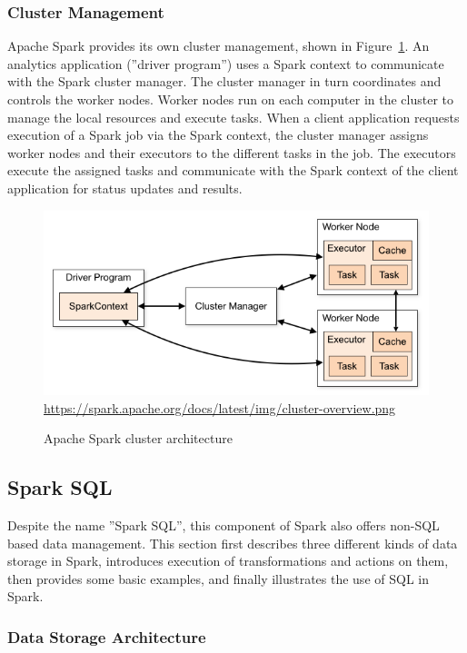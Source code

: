 \subsubsection*{Cluster Management}

Apache Spark provides its own cluster management, shown in Figure~\ref{fig:sparkcluster}. An analytics application (''driver program'') uses a Spark context to communicate with the Spark cluster manager. The cluster manager in turn coordinates and controls the worker nodes. Worker nodes run on each computer in the cluster to manage the local resources and execute tasks. When a client application requests execution of a Spark job via the Spark context, the cluster manager assigns worker nodes and their executors to the different tasks in the job. The executors execute the assigned tasks and communicate with the Spark context of the client application for status updates and results.

\begin{figure}
\centering

\includegraphics[width=.75\textwidth]{cluster-overview.png}
\scriptsize \url{https://spark.apache.org/docs/latest/img/cluster-overview.png}
\caption{Apache Spark cluster architecture}
\label{fig:sparkcluster}
\end{figure}

\subsection{Spark SQL}

Despite the name ''Spark SQL'', this component of Spark also offers non-SQL based data management. This section first describes three different kinds of data storage in Spark, introduces execution of transformations and actions on them, then provides some basic examples, and finally illustrates the use of SQL in Spark.

\subsubsection*{Data Storage Architecture}

